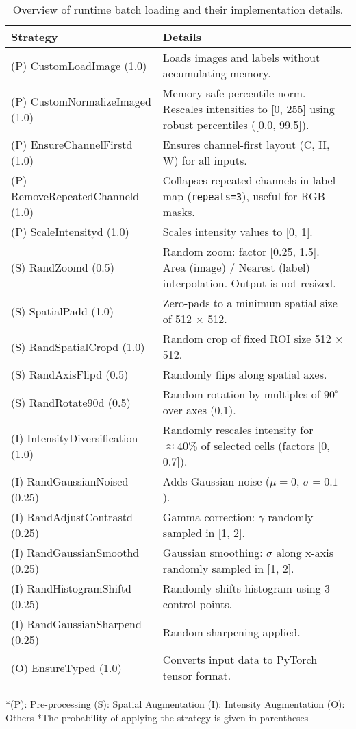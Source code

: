 \begin{table}[ht]
\centering
\footnotesize %
\caption{Overview of runtime batch loading and their implementation details.}
\label{tab:4.4}
\begin{tabular}{l p{10.0cm}} %
\toprule %
\textbf{Strategy} & \textbf{Details} \\
\midrule
\midrule
(P) CustomLoadImage (1.0) & Loads images and labels without accumulating memory. \\
(P) CustomNormalizeImaged (1.0) & Memory-safe percentile norm. Rescales intensities to [0, 255] using robust percentiles ([0.0, 99.5]). \\
(P) EnsureChannelFirstd (1.0) & Ensures channel-first layout (C, H, W) for all inputs. \\
(P) RemoveRepeatedChanneld (1.0) & Collapses repeated channels in label map (\texttt{repeats=3}), useful for RGB masks. \\
(P) ScaleIntensityd (1.0) & Scales intensity values to [0, 1]. \\
\midrule
(S) RandZoomd (0.5) & Random zoom: factor [0.25, 1.5]. Area (image) / Nearest (label) interpolation. Output is not resized. \\
(S) SpatialPadd (1.0) & Zero-pads to a minimum spatial size of 512 $\times$ 512. \\
(S) RandSpatialCropd (1.0) & Random crop of fixed ROI size 512 $\times$ 512. \\
(S) RandAxisFlipd (0.5) & Randomly flips along spatial axes. \\
(S) RandRotate90d (0.5) & Random rotation by multiples of $90^\circ$ over axes (0,1). \\
\midrule
(I) IntensityDiversification (1.0) & Randomly rescales intensity for $\approx 40\%$ of selected cells (factors [0, 0.7]). \\
(I) RandGaussianNoised (0.25) & Adds Gaussian noise ($\mu=0$, $\sigma=0.1$). \\
(I) RandAdjustContrastd (0.25) & Gamma correction: $\gamma$ randomly sampled in [1, 2]. \\
(I) RandGaussianSmoothd (0.25) & Gaussian smoothing: $\sigma$ along x-axis randomly sampled in [1, 2]. \\
(I) RandHistogramShiftd (0.25) & Randomly shifts histogram using 3 control points. \\
(I) RandGaussianSharpend (0.25) & Random sharpening applied. \\
\midrule
(O) EnsureTyped (1.0) & Converts input data to PyTorch tensor format. \\
\bottomrule %
\end{tabular}

\vspace{0.5em}
\small
{\raggedright 
*(P): Pre-processing (S): Spatial Augmentation (I): Intensity Augmentation (O): Others
*The probability of applying the strategy is given in parentheses\par}
\end{table}

